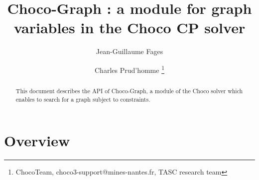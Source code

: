 \documentclass{article}
\begin{document}
\author{Jean-Guillaume Fages \and Charles Prud'homme \thanks{ChocoTeam, choco3-support@mines-nantes.fr, TASC research team}}                       
\title{Choco-Graph : a module for graph variables in the Choco CP solver}
\maketitle

\begin{abstract}
This document describes the API  of Choco-Graph, a module of the Choco solver which enables to search for a graph subject to constraints.
\end{abstract}

\newpage{}
\tableofcontents{}
\newpage{}

\newcommand{\GV}{\ensuremath{\mathcal{G}}}
\newcommand{\GLB}{\ensuremath{\underline{\mathcal{G}}}}
\newcommand{\GUB}{\ensuremath{\overline{\mathcal{G}}}}

\section{Overview}
\end{document}
